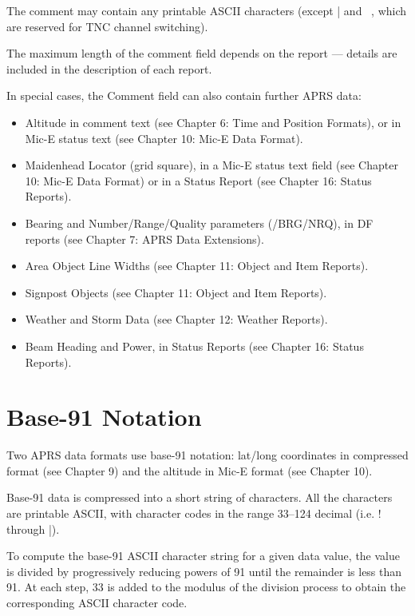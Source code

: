 The comment may contain any printable ASCII characters (except | and ~,
which are reserved for TNC channel switching).

The maximum length of the comment field depends on the report — details
are included in the description of each report.

In special cases, the Comment field can also contain further APRS data:

\begin{itemize}


\item Altitude in comment text (see Chapter 6: Time and Position Formats), or
in Mic-E status text (see Chapter 10: Mic-E Data Format).

\item Maidenhead Locator (grid square), in a Mic-E status text field (see
Chapter 10: Mic-E Data Format) or in a Status Report (see Chapter 16:
Status Reports).

\item Bearing and Number/Range/Quality parameters (/BRG/NRQ), in DF
reports (see Chapter 7: APRS Data Extensions).

\item Area Object Line Widths (see Chapter 11: Object and Item Reports).

\item Signpost Objects (see Chapter 11: Object and Item Reports).

\item Weather and Storm Data (see Chapter 12: Weather Reports).

\item Beam Heading and Power, in Status Reports (see Chapter 16: Status
Reports).

\end{itemize}

\section{Base-91 Notation}

Two APRS data formats use base-91 notation: lat/long coordinates in
compressed format (see Chapter 9) and the altitude in Mic-E format (see
Chapter 10).

Base-91 data is compressed into a short string of characters. All the
characters are printable ASCII, with character codes in the range 33–124
decimal (i.e. ! through |).

To compute the base-91 ASCII character string for a given data value, the
value is divided by progressively reducing powers of 91 until the remainder
is less than 91. At each step, 33 is added to the modulus of the division
process to obtain the corresponding ASCII character code.

